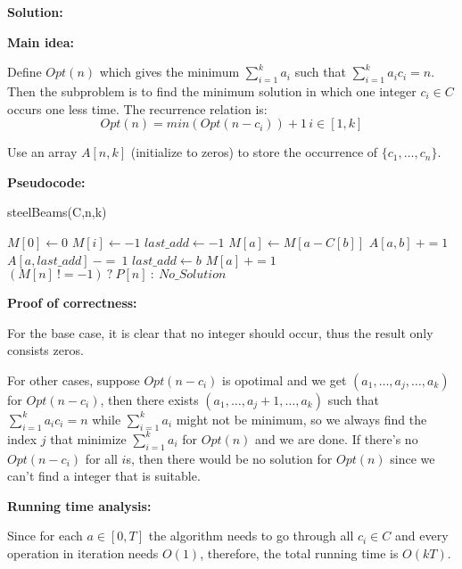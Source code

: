 \documentclass{article}
\begin{document}
{\color{blue}
\par\textbf{Solution: }
\par\textbf{Main idea: }
\par Define $Opt(n)$ which gives the minimum $\sum\limits_{i=1}^k a_i$ such that $\sum\limits_{i=1}^k a_ic_i=n$. Then the subproblem is to find the minimum solution in which one integer $c_i \in C$ occurs one less time. The recurrence relation is: 
\[Opt(n) = min(Opt(n-c_i)) + 1\, i \in [1,k]\]
\par Use an array $A[n,k]$ (initialize to zeros) to store the occurrence of $\{c_1,\ldots, c_n\}$.\\
	
	\par\textbf{Pseudocode: }
	\begin{algorithm}
			\caption{steelBeams(C,n,k)}
			\label{alg2}
			\color{blue}
			\begin{algorithmic}
				\STATE $M[0] \gets 0$
					\STATE	$M[i] \gets -1$
				\ENDWHILE
					\STATE $last\_add \gets -1$
								\STATE $M[a] \gets M[a-C[b]]$
								\STATE $A[a,b]\ += 1$
									\STATE $A[a,last\_add]\ -=\ 1$
								\ENDIF
								\STATE $last\_add \gets b$
							\ENDIF
						\ENDIF
					\ENDWHILE
					\STATE $M[a]\ += 1$
				\ENDWHILE
				\RETURN $(M[n]\ != -1)\ ?\ P[n]\ :\ No\_Solution$
			\end{algorithmic}
		\end{algorithm}

\par\textbf{Proof of correctness: }
\par For the base case, it is clear that no integer should occur, thus the result only consists zeros. 
\par For other cases, suppose $Opt(n-c_i)$ is opotimal and we get $(a_1,\ldots,a_{j},\ldots,a_k)$ for $Opt(n-c_i)$, then there exists $(a_1, \ldots, a_{j} + 1, \ldots, a_k)$ such that $\sum\limits_{i=1}^k a_ic_i=n$ while $\sum\limits_{i=1}^k a_i$ might not be minimum, so we always find the index $j$ that minimize $\sum\limits_{i=1}^k a_i$ for $Opt(n)$ and we are done. If there's no $Opt(n-c_i)$ for all $i$s, then there would be no solution for $Opt(n)$ since we can't find a integer that is suitable.\\

\par\textbf{Running time analysis: }
\par Since for each $a \in [0,T]$ the algorithm needs to go through all $c_i \in C$ and every operation in iteration needs $O(1)$, therefore, the total running time is $O(kT)$.
}
\pagebreak
\end{document}
